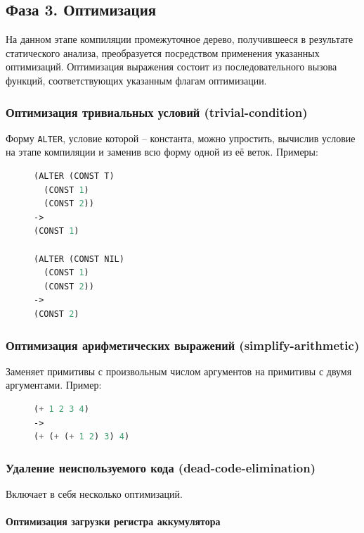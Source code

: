 \subsection{Фаза 3. Оптимизация}

На данном этапе компиляции промежуточное дерево, получившееся в результате статического анализа, преобразуется посредством применения указанных оптимизаций. Оптимизация выражения состоит из последовательного вызова функций, соответствующих указанным флагам оптимизации.


\subsubsection{Оптимизация тривиальных условий (trivial-condition)}

Форму \texttt{ALTER}, условие которой -- константа, можно упростить, вычислив условие на этапе компиляции и заменив всю форму одной из её веток. Примеры:

\begin{figure}[H]
\begin{lstlisting}[language=Lisp]
(ALTER (CONST T)
  (CONST 1)
  (CONST 2))
->
(CONST 1)

(ALTER (CONST NIL)
  (CONST 1)
  (CONST 2))
->
(CONST 2)
\end{lstlisting}
\end{figure}


\subsubsection{Оптимизация арифметических выражений (simplify-arithmetic)}

Заменяет примитивы с произвольным числом аргументов на примитивы с двумя аргументами. Пример:

\begin{figure}[H]
\begin{lstlisting}[language=Lisp]
(+ 1 2 3 4)
->
(+ (+ (+ 1 2) 3) 4)
\end{lstlisting}
\end{figure}


\subsubsection{Удаление неиспользуемого кода (dead-code-elimination)}

Включает в себя несколько оптимизаций.


\paragraph{Оптимизация загрузки регистра аккумулятора}

